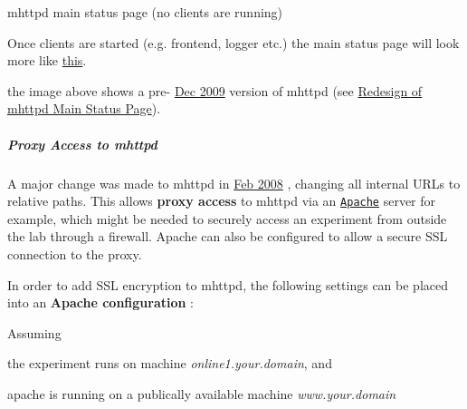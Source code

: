 \label{RC_mhttpd_utility_RC_mhttpd_minimal_status_page}
\hypertarget{RC_mhttpd_utility_RC_mhttpd_minimal_status_page}{}
 \begin{center} mhttpd main status page (no clients are running) \par
\par
\par
   \end{center}  \par


Once clients are started (e.g. frontend, logger etc.) the main status page will look more like \hyperlink{RC_mhttpd_Main_Status_page_RC_mhttpd_msp_customized}{this}.

the image above shows a pre-\/ \hyperlink{NDF_ndf_dec_2009}{Dec 2009} version of mhttpd (see \hyperlink{RC_mhttpd_status_page_redesign}{Redesign of mhttpd Main Status Page}).

\par
 

 \par


\label{RC_mhttpd_utility_idx_mhttpd_proxy-access}
\hypertarget{RC_mhttpd_utility_idx_mhttpd_proxy-access}{}
 \label{RC_mhttpd_utility_idx_access-control_mhttpd-proxy}
\hypertarget{RC_mhttpd_utility_idx_access-control_mhttpd-proxy}{}
 \label{RC_mhttpd_utility_idx_Apache}
\hypertarget{RC_mhttpd_utility_idx_Apache}{}
 \hypertarget{RC_mhttpd_utility_RC_mhttpd_proxy}{}\subparagraph{Proxy Access to mhttpd}\label{RC_mhttpd_utility_RC_mhttpd_proxy}
A major change was made to mhttpd in \hyperlink{NDF_ndf_feb_2008}{Feb 2008} , changing all internal URLs to relative paths. This allows {\bfseries proxy access} to mhttpd via an \href{http://apache.org/}{\tt Apache} server for example, which might be needed to securely access an experiment from outside the lab through a firewall. Apache can also be configured to allow a secure SSL connection to the proxy.

In order to add SSL encryption to mhttpd, the following settings can be placed into an {\bfseries Apache configuration} : \par
 Assuming
\begin{DoxyItemize}
\item the experiment runs on machine {\itshape online1.your.domain\/}, and
\item apache is running on a publically available machine {\itshape www.your.domain\/} \par

\end{DoxyItemize}


